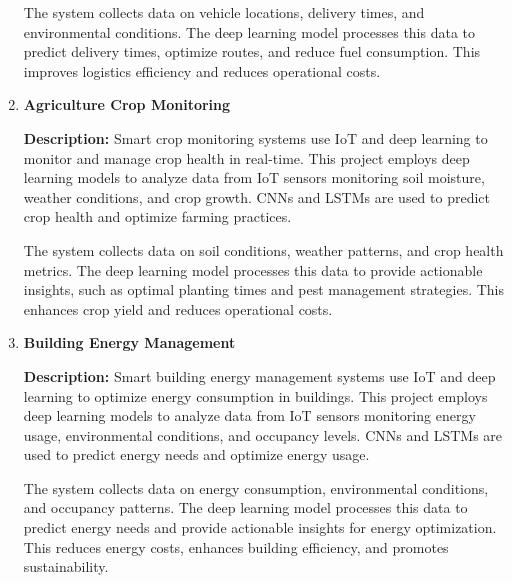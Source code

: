 \documentclass{article}
\begin{document}
\begin{enumerate}[label=\textbf{\arabic*.}, leftmargin=*]
The system collects data on vehicle locations, delivery times, and environmental conditions. The deep learning model processes this data to predict delivery times, optimize routes, and reduce fuel consumption. This improves logistics efficiency and reduces operational costs.



\vspace{24pt} %
\item \textbf{Agriculture Crop Monitoring}

\textbf{Description:}
Smart crop monitoring systems use IoT and deep learning to monitor and manage crop health in real-time. This project employs deep learning models to analyze data from IoT sensors monitoring soil moisture, weather conditions, and crop growth. CNNs and LSTMs are used to predict crop health and optimize farming practices.

The system collects data on soil conditions, weather patterns, and crop health metrics. The deep learning model processes this data to provide actionable insights, such as optimal planting times and pest management strategies. This enhances crop yield and reduces operational costs.



\vspace{24pt} %
\item \textbf{Building Energy Management}

\textbf{Description:}
Smart building energy management systems use IoT and deep learning to optimize energy consumption in buildings. This project employs deep learning models to analyze data from IoT sensors monitoring energy usage, environmental conditions, and occupancy levels. CNNs and LSTMs are used to predict energy needs and optimize energy usage.

The system collects data on energy consumption, environmental conditions, and occupancy patterns. The deep learning model processes this data to predict energy needs and provide actionable insights for energy optimization. This reduces energy costs, enhances building efficiency, and promotes sustainability.


\end{enumerate}
\end{document}
